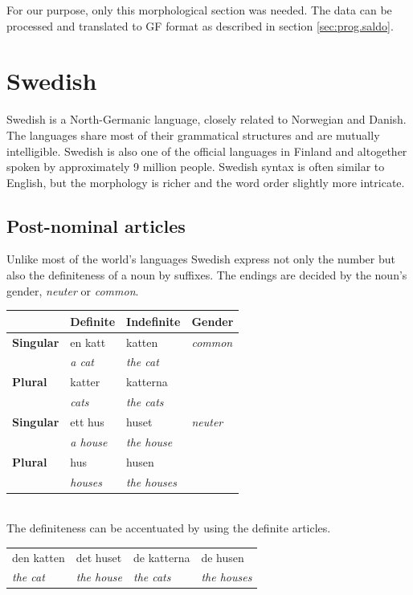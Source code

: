 \documentclass{report}
\begin{document}
For our purpose, only this morphological section was needed.
The data can be processed and translated to GF format as described in 
section \ref{sec:prog.saldo}.

\section{Swedish}
\label{sec:swedish}
Swedish \cite[Inl. ]{SAG}is a North-Germanic language,
closely related to Norwegian and Danish. The languages share most of their
grammatical structures and are mutually intelligible. Swedish is also 
one of the official languages in Finland and altogether spoken by approximately 9
million people.
Swedish syntax is often similar to English, but the  morphology is richer and the
word order slightly more intricate.

\subsection*{Post-nominal articles} 
\label{sec:swedishnoun}
Unlike most of the world's languages Swedish express not only the number but also
the definiteness of a noun by suffixes. The endings are decided by the noun's gender,
\textit{neuter} or \textit{common}.\\
\begin{tabular}{l|lll}
&\textbf{Definite}& \textbf{Indefinite}& \textbf{Gender} \\
 \hline
\textbf{Singular} & {en katt} & {katten} & \textit{common}\\
& \emph{a cat} & \emph{the cat} &\\
\textbf{Plural} & katter & katterna &\\
 &\emph{cats} & \emph{the cats} &\\
 \hline
\textbf{Singular} & {ett hus} & {huset} & \textit{neuter}\\
 & \emph{a house} & \emph{the house} & \\
\textbf{Plural} & hus & husen & \\
& \emph{houses} & \emph{the houses} & \\
\end{tabular}\\

The definiteness can be accentuated by using the definite articles.\\
\begin{tabular}{llll}
den katten & det huset & de katterna & de husen \\
\emph{the cat} & \emph{the house} & \emph{the cats} & \emph{the houses} \\
\end{tabular}\\
\end{document}
